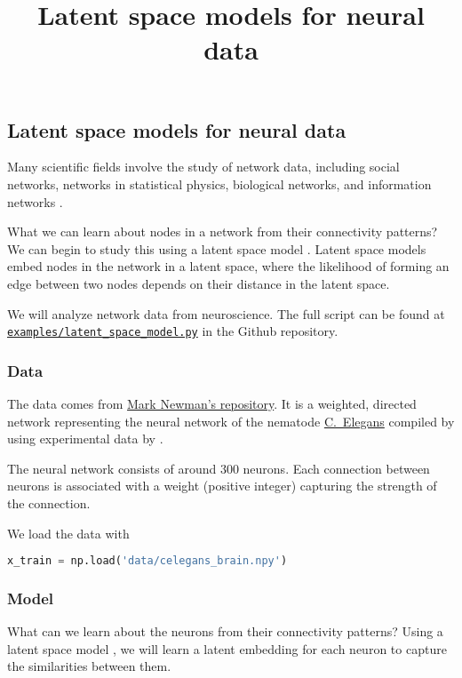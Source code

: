 \title{Latent space models for neural data}

\subsection{Latent space models for neural data}

Many scientific fields involve the study of network data, including
social networks, networks in statistical physics, biological
networks, and information networks
\citep{newman2010networks,goldenberg2010survey}.

What we can learn about nodes in a network from their connectivity patterns?
We can begin to study this using a latent space model \citep{hoff2002latent}.
Latent space models embed nodes in the network in a latent space,
where the likelihood of forming an edge between two nodes depends on
their distance in the latent space.

We will analyze network data from neuroscience.
The full script can be found at
\href{https://github.com/blei-lab/edward/blob/master/examples/latent_space_model.py}
{\texttt{examples/latent_space_model.py}} in the Github repository.

\subsubsection{Data}

The data comes from \href{http://www-personal.umich.edu/~mejn/netdata/}{Mark Newman's repository}.
It is a weighted, directed network representing the neural network of
the nematode
\href{https://en.wikipedia.org/wiki/Caenorhabditis_elegans}{C.~Elegans}
compiled by \citet{watts1998collective} using experimental data
by \citet{white1986structure}.

The neural network consists of around $300$ neurons. Each connection
between neurons
is associated with a weight (positive integer) capturing the strength
of the connection.

We load the data with
\begin{lstlisting}[language=Python]
x_train = np.load('data/celegans_brain.npy')
\end{lstlisting}

\subsubsection{Model}

What can we learn about the neurons from their connectivity patterns? Using
a latent space model \citep{hoff2002latent}, we will learn a latent
embedding for each neuron to capture the similarities between them.

